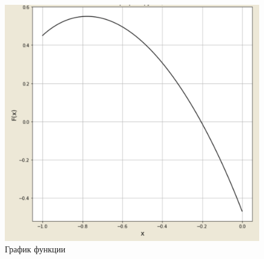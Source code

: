 \documentclass[10pt]{article}
\begin{document}
\begin{figure}[h!]
\centering
\includegraphics[width=0.8\linewidth]{f.png}
\caption{График функции}
\label{fig:image1}
\end{figure}
\newpage
\end{document}

